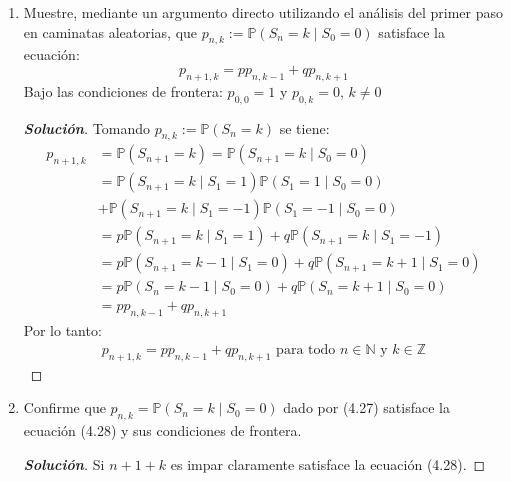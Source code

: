 \documentclass[12pt, letterpaper]{article}
\newcommand{\p}{\mathbb{P}}
\newcommand{\todo}{\textrm{ para todo }}
\newenvironment{manualtheorem}[1]{%
  \renewcommand\themanualtheoreminner{#1}%
  \manualtheoreminner
}{\endmanualtheoreminner}
\newenvironment{solucion}
  {\renewcommand\qedsymbol{$\square$}\begin{proof}[\textbf{Solución}]}
  {\end{proof}}
\begin{document}
\begin{manualtheorem}{4.1}
\begin{enumerate}
\begin{solucion}
        \end{solucion}
        
        \item Muestre, mediante un argumento directo utilizando el análisis del primer paso en caminatas aleatorias, que $p_{n,k}:= \p(S_n = k  \mid  S_0 = 0)$ satisface la ecuación:
        $$p_{n+1,k}=pp_{n,k-1}+qp_{n,k+1}$$
        Bajo las condiciones de frontera: $p_{0,0}=1$ y $p_{0,k}=0$, $k\neq 0$
        \begin{solucion}
            Tomando $p_{n,k}:=\p(S_n=k)$ se tiene:
            \begin{align*}
                p_{n+1,k}&=\p(S_{n+1}=k)=\p(S_{n+1}=k\mid S_0=0)\\
                &=\p(S_{n+1}=k\mid S_1=1)\p(S_1=1\mid S_0=0)\\
                &+\p(S_{n+1}=k\mid S_1=-1)\p(S_1=-1\mid S_0=0)\\
                &=p\p(S_{n+1}=k\mid S_1=1)+q\p(S_{n+1}=k\mid S_1=-1)\\
                &=p\p(S_{n+1}=k-1\mid S_1=0)+q\p(S_{n+1}=k+1\mid S_1=0)\\
                &=p\p(S_{n}=k-1\mid S_0=0)+q\p(S_{n}=k+1\mid S_0=0)\\
                &=pp_{n,k-1}+qp_{n,k+1}
            \end{align*}
            Por lo tanto:
            \begin{align*}
                p_{n+1,k}=pp_{n,k-1}+qp_{n,k+1}\todo n\in \mathbb{N}\textrm{ y }k\in \mathbb{Z}
            \end{align*}
        \end{solucion}
        
        \item Confirme que $p_{n, k} = \p (S_n = k \mid S_0 = 0)$ dado por (4.27) satisface la ecuación (4.28) y sus condiciones de frontera.
        \begin{solucion}
            Si $n+1+k$ es impar claramente satisface la ecuación (4.28).
            

\end{solucion}
\end{enumerate}
\end{manualtheorem}
\end{document}
